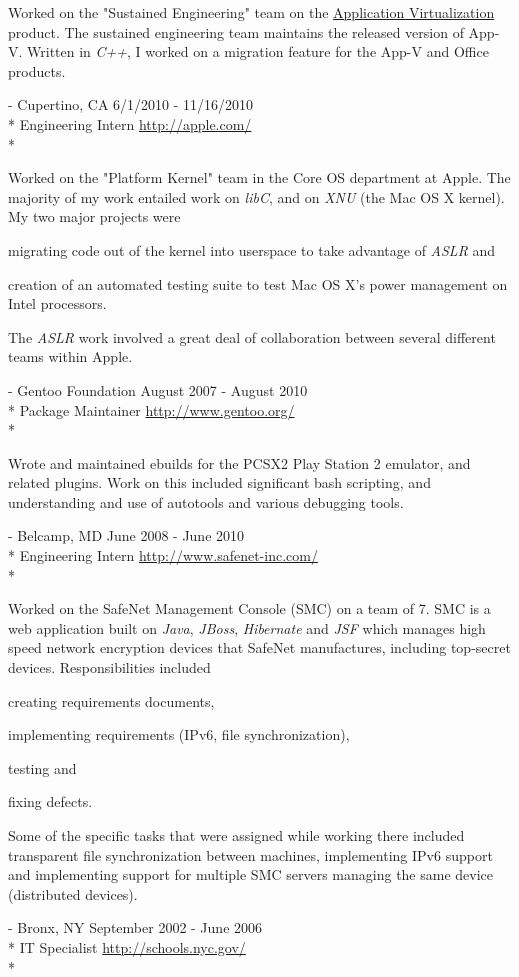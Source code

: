 \documentclass[a4paper,margin,line]{resume}
\newcommand{\rurl}[1]{\hfill {\footnotesize \url{#1}}}
\newcommand{\rdate}[1]{\hfill {\small #1}}
\renewcommand{\employer}[5]{\item[#1] - #2 \rdate{#3} \\* #4 \rurl{#5} \\*}
\begin{document}
\begin{resume}
\begin{asparadesc}
		\small
		Worked on the "Sustained Engineering" team on the \href{http://www.microsoft.com/windows/enterprise/solutions/virtualization/products/app-v.aspx}{Application Virtualization} product. The sustained engineering team maintains the released version of App-V. Written in \emph{C++}, I worked on a migration feature for the App-V and Office products.
		\normalsize
		\\
		\employer{Apple Inc}{Cupertino, CA}{6/1/2010 - 11/16/2010}{Engineering Intern}{http://apple.com/}

		\small
		Worked on the "Platform Kernel" team in the Core OS department at Apple. The majority of my work entailed work on \emph{libC}, and on \emph{XNU} (the Mac OS X kernel). My two major projects were \begin{inparaenum} \item migrating code out of the kernel into userspace to take advantage of \emph{ASLR} and \item creation of an automated testing suite to test Mac OS X's power management on Intel processors. \end{inparaenum} The \emph{ASLR} work involved a great deal of collaboration between several different teams within Apple.
		\normalsize
		\\
		\employer{Gentoo Linux}{Gentoo Foundation}{August 2007 - August 2010}{Package Maintainer}{http://www.gentoo.org/}

		\small
		Wrote and maintained ebuilds for the PCSX2 Play Station 2 emulator, and
		related plugins. Work on this included significant bash scripting,
		and understanding and use of autotools and various debugging tools.
		\normalsize
		\\
		\employer{SafeNet Inc}{Belcamp, MD}{June 2008 - June 2010}{Engineering Intern}{http://www.safenet-inc.com/}

		\small
		Worked on the SafeNet Management Console (SMC) on a team of 7. SMC is a web application built on \emph{Java}, \emph{JBoss}, \emph{Hibernate} and \emph{JSF} which manages high speed network encryption devices that SafeNet manufactures, including top-secret devices. Responsibilities included \begin{inparaenum} \item creating requirements documents, \item implementing requirements (IPv6, file synchronization), \item testing and \item fixing defects. \end{inparaenum} Some of the specific tasks that were assigned while working there included transparent file synchronization between machines, implementing IPv6 support and implementing support for multiple SMC servers managing the same device (distributed devices).
		\normalsize
		\\
		\employer{New York City Department of Education}{Bronx, NY}{September 2002 - June 2006}{IT Specialist}{http://schools.nyc.gov/}


\end{asparadesc}
\end{resume}
\end{document}
